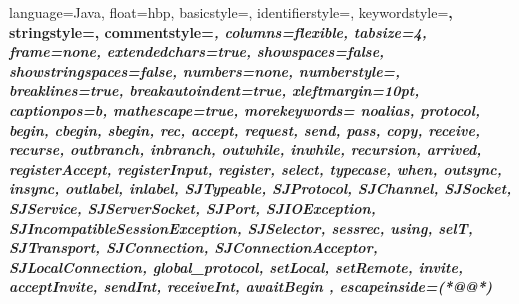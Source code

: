 \newcommand{\ARG}[1]{{\rm\em #1}}

\newcommand{\CODESIZE}{\small} %
\newcommand{\LISTINGSIZE}{\fontsize{8}{10}\selectfont} %
\newcommand{\CODE}[1]{\texttt{\CODESIZE #1}} %
\newcommand{\LST}[1]{\lstinline@#1@} %

\newcommand{\OPIN}[2]{\ensuremath{\CODE{#1}(#2)}} %
\newcommand{\OPOUT}[2]{\ensuremath{\CODE{#1}\langle #2 \rangle}} %
\newcommand{\PARTY}[1]{\ensuremath{\textbf{#1}}} %

\newcommand{\LISTINGSTYLE}{\ttfamily\LISTINGSIZE}

\lstset
{
	language=Java,
	float=hbp,
	basicstyle=\ttfamily\CODESIZE, %
	identifierstyle=\color{Black},
	keywordstyle=\bfseries\color{blue},
	stringstyle=\color{Violet},
	commentstyle=\itshape\color{RedViolet},
	columns=flexible,
	tabsize=4,
	frame=none,
	extendedchars=true,
	showspaces=false,
	showstringspaces=false,
	numbers=none,
	numberstyle=\tiny,
	breaklines=true,
	breakautoindent=true,
	xleftmargin=10pt,
	captionpos=b,
	mathescape=true,
	morekeywords=
	{	
		noalias,
		protocol, begin, cbegin, sbegin, rec,
		accept,
		request, send, pass, copy, receive, recurse, 
		outbranch, inbranch, outwhile, inwhile, recursion, 
		arrived, registerAccept, registerInput, register, select, 
		typecase, when, 
		outsync, insync, outlabel, inlabel, 
		SJTypeable, SJProtocol, SJChannel, SJSocket, SJService, SJServerSocket, SJPort, 
		SJIOException, SJIncompatibleSessionException, 
		SJSelector,  
		sessrec, 
		using,
                selT,
		SJTransport,  SJConnection,  SJConnectionAcceptor,  SJLocalConnection,
		global_protocol,
		setLocal, setRemote, invite, acceptInvite,
		sendInt, receiveInt,
		awaitBegin
	},
	escapeinside={(*@}{@*)}
}


